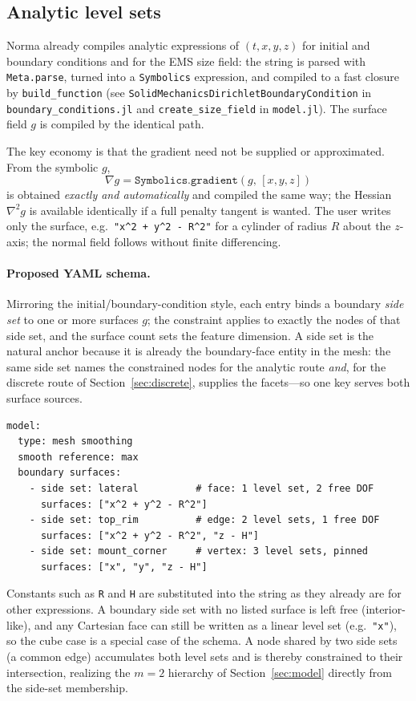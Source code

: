 \documentclass[11pt]{article}
\newcommand{\grad}{\nabla}
\newcommand{\code}[1]{\texttt{#1}}
\begin{document}
\subsection{Analytic level sets}
\label{sec:analytic}

Norma already compiles analytic expressions of $(t,x,y,z)$ for initial and
boundary conditions and for the EMS size field: the string is parsed with
\code{Meta.parse}, turned into a \code{Symbolics} expression, and compiled to a
fast closure by \code{build\_function} (see
\code{SolidMechanicsDirichletBoundaryCondition} in \code{boundary\_conditions.jl}
and \code{create\_size\_field} in \code{model.jl}). The surface field $g$ is
compiled by the identical path.

The key economy is that the gradient need not be supplied or approximated. From
the symbolic $g$,
\begin{equation}
  \grad g = \code{Symbolics.gradient}(g,\,[x,y,z])
\end{equation}
is obtained \emph{exactly and automatically} and compiled the same way; the
Hessian $\grad^2 g$ is available identically if a full penalty tangent is
wanted. The user writes only the surface, e.g.\ \code{"x\^{}2 + y\^{}2 - R\^{}2"}
for a cylinder of radius $R$ about the $z$-axis; the normal field follows
without finite differencing.

\paragraph{Proposed YAML schema.} Mirroring the initial/boundary-condition
style, each entry binds a boundary \emph{side set} to one or more surfaces $g$;
the constraint applies to exactly the nodes of that side set, and the surface
count sets the feature dimension. A side set is the natural anchor because it is
already the boundary-face entity in the mesh: the same side set names the
constrained nodes for the analytic route \emph{and}, for the discrete route of
Section~\ref{sec:discrete}, supplies the facets---so one key serves both surface
sources.
\begin{verbatim}
model:
  type: mesh smoothing
  smooth reference: max
  boundary surfaces:
    - side set: lateral          # face: 1 level set, 2 free DOF
      surfaces: ["x^2 + y^2 - R^2"]
    - side set: top_rim          # edge: 2 level sets, 1 free DOF
      surfaces: ["x^2 + y^2 - R^2", "z - H"]
    - side set: mount_corner     # vertex: 3 level sets, pinned
      surfaces: ["x", "y", "z - H"]
\end{verbatim}
Constants such as \code{R} and \code{H} are substituted into the string as they
already are for other expressions. A boundary side set with no listed surface is
left free (interior-like), and any Cartesian face can still be written as a
linear level set (e.g.\ \code{"x"}), so the cube case is a special case of the
schema. A node shared by two side sets (a common edge) accumulates both level
sets and is thereby constrained to their intersection, realizing the
$m=2$ hierarchy of Section~\ref{sec:model} directly from the side-set
membership.
\end{document}
